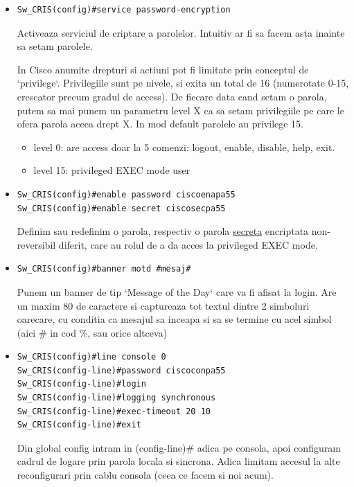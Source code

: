 \documentclass{article}
\begin{document}
\begin{itemize}
Deci hai sa dezactivam asta pentru securitate.

\item
\begin{verbatim}
Sw_CRIS(config)#service password-encryption
\end{verbatim}
Activeaza serviciul de criptare a parolelor. Intuitiv ar fi sa facem asta inainte sa setam parolele.

In Cisco anumite drepturi si actiuni pot fi limitate prin conceptul de `privilege`. Privilegiile sunt pe nivele, si exita un total de 16 (numerotate 0-15, crescator precum gradul de access). De fiecare data cand setam o parola, putem sa mai punem un parametru {level X} ca sa setam privilegiile pe care le ofera parola aceea drept X. In mod default parolele au privilege 15.
\begin{itemize}
    \item{level 0:} are access doar la 5 comenzi: logout, enable, disable, help, exit. 
    \item{level 15:} privileged EXEC mode user
\end{itemize}

\item
\begin{verbatim}
Sw_CRIS(config)#enable password ciscoenapa55
Sw_CRIS(config)#enable secret ciscosecpa55
\end{verbatim}
Definim sau redefinim o parola, respectiv o parola \underline{secreta} encriptata non-reversibil diferit, care au rolul de a da acces la privileged EXEC mode.


\item
\begin{verbatim}
Sw_CRIS(config)#banner motd #mesaj#
\end{verbatim}
Punem un banner de tip `Message of the Day` care va fi afisat la login.
Are un maxim 80 de caractere si captureaza tot textul dintre 2 simboluri oarecare, cu conditia ca mesajul sa inceapa si sa se termine cu acel simbol (aici \# in cod \%, sau orice altceva)

\item
\begin{verbatim}
Sw_CRIS(config)#line console 0
Sw_CRIS(config-line)#password ciscoconpa55
Sw_CRIS(config-line)#login
Sw_CRIS(config-line)#logging synchronous
Sw_CRIS(config-line)#exec-timeout 20 10
Sw_CRIS(config-line)#exit
\end{verbatim}
Din global config intram in (config-line)\# adica pe consola, apoi configuram cadrul de logare prin parola locala si sincrona. Adica limitam accesul la alte reconfigurari prin cablu consola (ceea ce facem si noi acum).


\end{itemize}
\end{document}
